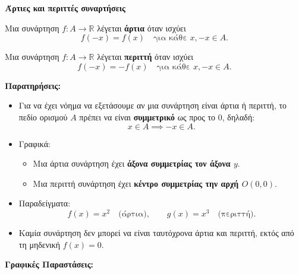 {\large \textbf{Άρτιες και περιττές συναρτήσεις}}
\vspace{1em}

Μια συνάρτηση $f: A \to \mathbb{R}$ λέγεται \textbf{άρτια} όταν ισχύει
\[
f(-x) = f(x) \quad \text{για κάθε } x, -x \in A.
\]

\vspace{1em}

Μια συνάρτηση $f: A \to \mathbb{R}$ λέγεται \textbf{περιττή} όταν ισχύει
\[
f(-x) = -f(x) \quad \text{για κάθε } x, -x \in A.
\]

\vspace{1em}

\textbf{Παρατηρήσεις:}
\begin{itemize}
  \item Για να έχει νόημα να εξετάσουμε αν μια συνάρτηση είναι άρτια ή περιττή, το πεδίο ορισμού $A$ πρέπει να είναι \textbf{συμμετρικό} ως προς το $0$, δηλαδή:
  \[
  x \in A \implies -x \in A.
  \]
  \item Γραφικά:
  \begin{itemize}
    \item Μια άρτια συνάρτηση έχει \textbf{άξονα συμμετρίας τον άξονα $y$}.
    \item Μια περιττή συνάρτηση έχει \textbf{κέντρο συμμετρίας την αρχή $O(0,0)$}.
  \end{itemize}
  \item Παραδείγματα:
  \[
  f(x) = x^2 \quad \text{(άρτια)}, \qquad g(x) = x^3 \quad \text{(περιττή)}.
  \]
  \item Καμία συνάρτηση δεν μπορεί να είναι ταυτόχρονα άρτια και περιττή, εκτός από τη μηδενική $f(x)=0$.
\end{itemize}

\textbf{Γραφικές Παραστάσεις:}

\begin{center}
\hspace{2cm}
\end{center}
